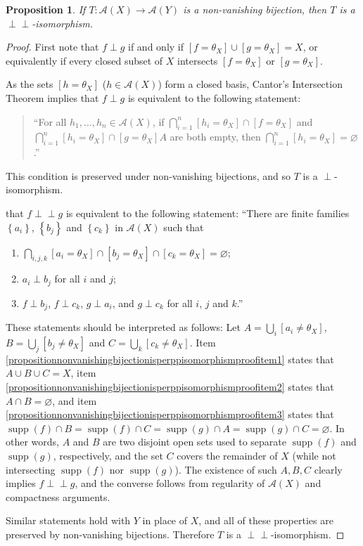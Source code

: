 \documentclass[letter,11pt]{amsart}
\theoremstyle{plain}		\newtheorem{theorem}[generalnumbering]{Theorem}
\theoremstyle{plain}		\newtheorem{corollary}[generalnumbering]{Corollary}
\theoremstyle{definition}		\newtheorem{definition}[generalnumbering]{Definition}
\theoremstyle{definition}		\newtheorem{example}[generalnumbering]{Example}
\theoremstyle{plain}		\newtheorem{proposition}[generalnumbering]{Proposition}
\theoremstyle{plain}		\newtheorem{lemma}[generalnumbering]{Lemma}
\theoremstyle{plain}    \newtheorem{plainstyle}[generalnumbering]{\namefordifferentenvironment}
\theoremstyle{plain}    \newtheorem*{plainstyle*}{\namefordifferentenvironment}
\theoremstyle{definition}    \newtheorem{definitionstyle}[generalnumbering]{\namefordifferentenvironment}
\theoremstyle{definition}    \newtheorem*{definitionstyle*}{\namefordifferentenvironment}
\newcommand{\perpp}{\perp\!\!\!\perp}
\DeclareMathOperator{\supp}{supp}
\begin{document}
\begin{proposition}\label{propositionnonvanishingbijectionisperppisomorphism}
	If $T\colon\mathcal{A}(X)\to\mathcal{A}(Y)$ is a non-vanishing bijection, then $T$ is a $\perpp$-isomorphism.
\end{proposition}
\begin{proof}
	First note that $f\perp g$ if and only if $[f=\theta_X]\cup[g=\theta_X]=X$, or equivalently if every closed subset of $X$ intersects $[f=\theta_X]$ or $[g=\theta_X]$.
	
	As the sets $[h=\theta_X]$ ($h\in\mathcal{A}(X)$) form a closed basis, Cantor's Intersection Theorem implies that $f\perp g$ is equivalent to the following statement:
	\begin{quote}
		``For all $h_1,\ldots,h_n\in\mathcal{A}(X)$, if $\bigcap_{i=1}^n[h_i=\theta_X]\cap[f=\theta_X]$ and $\bigcap_{i=1}^n[h_i=\theta_X]\cap[g=\theta_X]A$ are both empty, then $\bigcap_{i=1}^n[h_i=\theta_X]=\varnothing$.''
	\end{quote}
	This condition is preserved under non-vanishing bijections, and so $T$ is a $\perp$-isomorphism.
	
	that $f\perpp g$ is equivalent to the following statement: ``There are finite families $\left\{a_i\right\}$, $\left\{b_j\right\}$ and $\left\{c_k\right\}$ in $\mathcal{A}(X)$ such that
	\begin{enumerate}[label=(\roman*)]
		\item\label{propositionnonvanishingbijectionisperppisomorphismproofitem1} $\bigcap_{i,j,k}[a_i=\theta_X]\cap[b_j=\theta_X]\cap[c_k=\theta_X]=\varnothing$;
		\item\label{propositionnonvanishingbijectionisperppisomorphismproofitem2} $a_i\perp b_j$ for all $i$ and $j$;
		\item\label{propositionnonvanishingbijectionisperppisomorphismproofitem3} $f\perp b_j$, $f\perp c_k$, $g\perp a_i$, and $g\perp c_k$ for all $i$, $j$ and $k$.''
	\end{enumerate}
	
	These statements should be interpreted as follows: Let $A=\bigcup_i[a_i\neq\theta_X]$, $B=\bigcup_j[b_j\neq\theta_X]$ and $C=\bigcup_k[c_k\neq\theta_X]$. Item \ref{propositionnonvanishingbijectionisperppisomorphismproofitem1} states that $A\cup B\cup C=X$, item \ref{propositionnonvanishingbijectionisperppisomorphismproofitem2} states that $A\cap B=\varnothing$, and item \ref{propositionnonvanishingbijectionisperppisomorphismproofitem3} states that $\supp(f)\cap B=\supp(f)\cap C=\supp(g)\cap A=\supp(g)\cap C=\varnothing$.
	In other words, $A$ and $B$ are two disjoint open sets used to separate $\supp(f)$ and $\supp(g)$, respectively, and the set $C$ covers the remainder of $X$ (while not intersecting $\supp(f)$ nor $\supp(g)$). The existence of such $A,B,C$ clearly implies $f\perpp g$, and the converse follows from regularity of $\mathcal{A}(X)$ and compactness arguments.
	
	Similar statements hold with $Y$ in place of $X$, and all of these properties are preserved by non-vanishing bijections. Therefore $T$ is a $\perpp$-isomorphism.
\end{proof}
\end{document}
